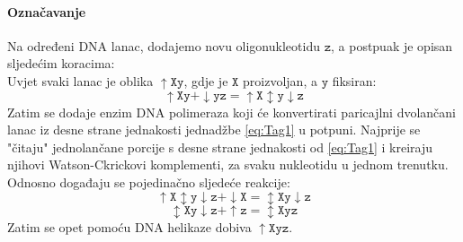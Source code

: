 \documentclass[a4paper,oneside,12pt]{memoir} %
\begin{document}
\begin{spacing}{1.5}
\paragraph{Označavanje} Na određeni DNA lanac, dodajemo novu oligonukleotidu $\mathtt{z}$, a postpuak je opisan sljedećim koracima:\\
Uvjet svaki lanac je oblika $\mathtt{\uparrow Xy}$, gdje je $\mathtt{X}$ proizvoljan, a $\mathtt{y}$ fiksiran:
\begin{equation}
\label{eq:Tag1}
\mathtt{\uparrow Xy + \downarrow yz=\uparrow X \updownarrow y \downarrow z}
\end{equation}
Zatim se dodaje enzim DNA polimeraza koji će konvertirati paricajlni dvolančani lanac iz desne strane jednakosti jednadžbe \ref{eq:Tag1} u potpuni. Najprije se "čitaju" jednolančane porcije s desne strane jednakosti od \ref{eq:Tag1} i kreiraju njihovi Watson-Ckrickovi komplementi, za svaku nukleotidu u jednom trenutku. Odnosno događaju se pojedinačno sljedeće reakcije:
\begin{equation}
\label{eq:Tag2}
\mathtt{\uparrow X \updownarrow y \downarrow z + \downarrow X = \updownarrow Xy \downarrow z}
\end{equation}
\begin{equation}
\label{eq:Tag3}
\mathtt{\updownarrow Xy \downarrow z + \uparrow z = \updownarrow Xyz}
\end{equation}
Zatim se opet pomoću DNA helikaze dobiva $\mathtt{\uparrow Xyz}$.


\end{spacing}
\end{document}
